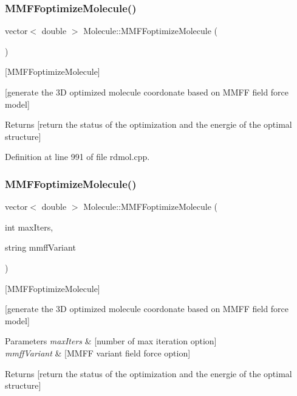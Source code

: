 \subsubsection{\texorpdfstring{M\+M\+F\+Foptimize\+Molecule()}{MMFFoptimizeMolecule()}\hspace{0.1cm}{\footnotesize\ttfamily [1/2]}}
{\footnotesize\ttfamily vector$<$ double $>$ Molecule\+::\+M\+M\+F\+Foptimize\+Molecule (\begin{DoxyParamCaption}{ }\end{DoxyParamCaption})}



\mbox{[}M\+M\+F\+Foptimize\+Molecule\mbox{]} 

\mbox{[}generate the 3D optimized molecule coordonate based on M\+M\+FF field force model\mbox{]}

\begin{DoxyReturn}{Returns}
\mbox{[}return the status of the optimization and the energie of the optimal structure\mbox{]} 
\end{DoxyReturn}


Definition at line 991 of file rdmol.\+cpp.

\mbox{\label{class_molecule_a871ec0fe06c07a873ef29d1af4190640}} 
\subsubsection{\texorpdfstring{M\+M\+F\+Foptimize\+Molecule()}{MMFFoptimizeMolecule()}\hspace{0.1cm}{\footnotesize\ttfamily [2/2]}}
{\footnotesize\ttfamily vector$<$ double $>$ Molecule\+::\+M\+M\+F\+Foptimize\+Molecule (\begin{DoxyParamCaption}\item[{int}]{max\+Iters,  }\item[{string}]{mmff\+Variant }\end{DoxyParamCaption})}



\mbox{[}M\+M\+F\+Foptimize\+Molecule\mbox{]} 

\mbox{[}generate the 3D optimized molecule coordonate based on M\+M\+FF field force model\mbox{]}


\begin{DoxyParams}{Parameters}
{\em max\+Iters} & \mbox{[}number of max iteration option\mbox{]} \\
\hline
{\em mmff\+Variant} & \mbox{[}M\+M\+FF variant field force option\mbox{]} \\
\hline
\end{DoxyParams}
\begin{DoxyReturn}{Returns}
\mbox{[}return the status of the optimization and the energie of the optimal structure\mbox{]} 
\end{DoxyReturn}


